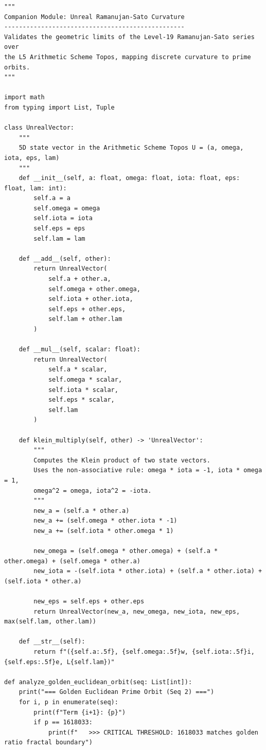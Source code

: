 \begin{verbatim}
"""
Companion Module: Unreal Ramanujan-Sato Curvature
-------------------------------------------------
Validates the geometric limits of the Level-19 Ramanujan-Sato series over
the L5 Arithmetic Scheme Topos, mapping discrete curvature to prime orbits.
"""

import math
from typing import List, Tuple

class UnrealVector:
    """
    5D state vector in the Arithmetic Scheme Topos U = (a, omega, iota, eps, lam)
    """
    def __init__(self, a: float, omega: float, iota: float, eps: float, lam: int):
        self.a = a
        self.omega = omega
        self.iota = iota
        self.eps = eps
        self.lam = lam

    def __add__(self, other):
        return UnrealVector(
            self.a + other.a,
            self.omega + other.omega,
            self.iota + other.iota,
            self.eps + other.eps,
            self.lam + other.lam
        )

    def __mul__(self, scalar: float):
        return UnrealVector(
            self.a * scalar,
            self.omega * scalar,
            self.iota * scalar,
            self.eps * scalar,
            self.lam
        )
        
    def klein_multiply(self, other) -> 'UnrealVector':
        """
        Computes the Klein product of two state vectors.
        Uses the non-associative rule: omega * iota = -1, iota * omega = 1,
        omega^2 = omega, iota^2 = -iota.
        """
        new_a = (self.a * other.a)
        new_a += (self.omega * other.iota * -1)
        new_a += (self.iota * other.omega * 1)
        
        new_omega = (self.omega * other.omega) + (self.a * other.omega) + (self.omega * other.a)
        new_iota = -(self.iota * other.iota) + (self.a * other.iota) + (self.iota * other.a)
        
        new_eps = self.eps + other.eps
        return UnrealVector(new_a, new_omega, new_iota, new_eps, max(self.lam, other.lam))
        
    def __str__(self):
        return f"({self.a:.5f}, {self.omega:.5f}w, {self.iota:.5f}i, {self.eps:.5f}e, L{self.lam})"

def analyze_golden_euclidean_orbit(seq: List[int]):
    print("=== Golden Euclidean Prime Orbit (Seq 2) ===")
    for i, p in enumerate(seq):
        print(f"Term {i+1}: {p}")
        if p == 1618033:
            print(f"   >>> CRITICAL THRESHOLD: 1618033 matches golden ratio fractal boundary")


\end{verbatim}
